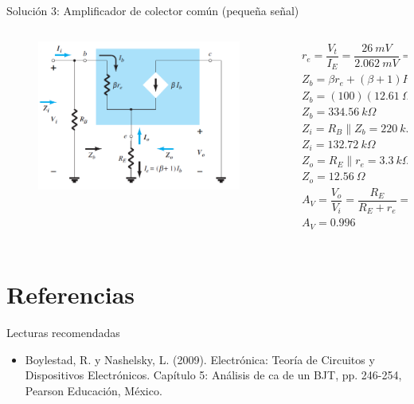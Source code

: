 \documentclass[t,aspectratio=169]{beamer}
\begin{document}
\begin{frame}{Solución 3: Amplificador de colector común (pequeña señal)}

\begin{columns}
\begin{column}{0.5\textwidth}

\begin{figure}[H]
    \centering
    \includegraphics[width=\textwidth]{figuras/modelo_re_colector_comun_2.png}
\end{figure}

\end{column}
\begin{column}{0.5\textwidth}
\begin{align*}
&r_e = \dfrac{V_t}{I_E} = \dfrac{26\ mV}{2.062\ mV} = 12.61\ \Omega \\
&Z_b = \beta r_e + (\beta + 1) R_E \\
&Z_b = (100)(12.61\ \Omega) + (101)(3.3\ k\Omega) \\
&Z_b = 334.56\ k\Omega \\
&Z_i = R_B \parallel Z_b = 220\ k\Omega \parallel 334.56\ k\Omega \\
&Z_i = 132.72\ k\Omega \\
&Z_o = R_E \parallel r_e = 3.3\ k\Omega \parallel 12.61\ \Omega \\
&Z_o = 12.56\ \Omega \\
&A_V = \dfrac{V_o}{V_i} = \dfrac{R_E}{R_E + r_e} = \dfrac{3.3\ k\Omega}{3.3\ k\Omega + 12.61\ \Omega} \\
&A_V = 0.996 \\
\end{align*}

\end{column}
\end{columns}

\end{frame}


\section{Referencias}
\begin{frame}{Lecturas recomendadas}

\begin{itemize}
\item Boylestad, R. y Nashelsky, L. (2009). Electrónica: Teoría de Circuitos y Dispositivos Electrónicos. Capítulo 5: Análisis de ca de un BJT, pp. 246-254, Pearson Educación, México.
\end{itemize}

\end{frame}
\end{document}
